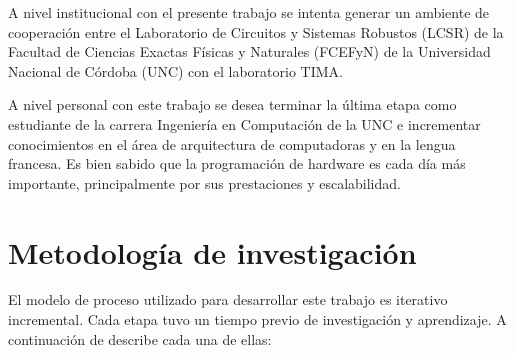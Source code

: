 \documentclass[a4paper,openright,12pt]{report}
\begin{document}
A nivel institucional con el presente trabajo  se intenta generar un ambiente de cooperación entre el Laboratorio de Circuitos y Sistemas Robustos (LCSR) de la Facultad de Ciencias Exactas Físicas y Naturales (FCEFyN) de la  Universidad Nacional de Córdoba (UNC) con el laboratorio TIMA. 

A nivel personal con este trabajo se desea terminar la  última etapa como  estudiante de la carrera Ingeniería en Computación de la UNC e incrementar conocimientos en el área de arquitectura de computadoras y en la lengua francesa.
Es bien sabido que la programación de hardware es cada día más importante, principalmente por sus prestaciones y  escalabilidad.


\section{Metodología de investigación }

El modelo de  proceso utilizado para desarrollar  este trabajo es  iterativo incremental. Cada etapa  tuvo un tiempo previo de investigación y aprendizaje. A continuación de describe cada una de ellas:
\end{document}
